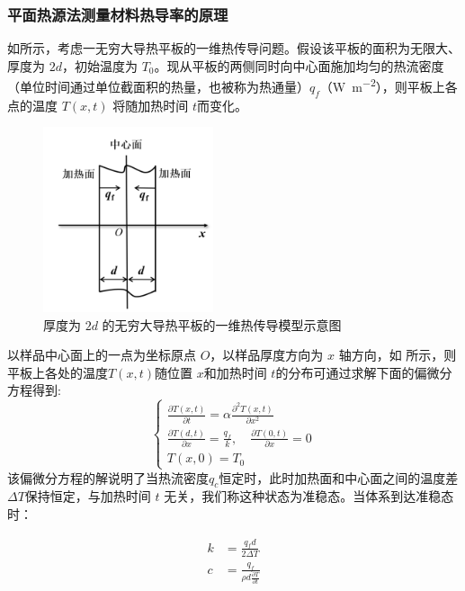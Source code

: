         \subsubsection{平面热源法测量材料热导率的原理}
            如所示，考虑一无穷大导热平板的一维热传导问题。假设该平板的面积为无限大、厚度为 $2d$，初始温度为 $T_0$。现从平板的两侧同时向中心面施加均匀的热流密度（单位时间通过单位截面积的热量，也被称为热通量）$q_f$（\unit{\watt\per\meter\squared}），则平板上各点的温度 $T(x,t)$ 将随加热时间 $t$而变化。
            \begin{figure}[!ht]\centering
                \includegraphics[width=50mm]{img/A10/fg2.png}
                \caption{厚度为 $2d$ 的无穷大导热平板的一维热传导模型示意图 \label{fig:A10.2}}
            \end{figure}\par
            以样品中心面上的一点为坐标原点 $O$，以样品厚度方向为 $x$ 轴方向，如 所示，则平板上各处的温度$T(x,t)$随位置 $x$和加热时间 $t$的分布可通过求解下面的偏微分方程得到:
            \begin{equation}
                \begin{cases}
                    \frac{\partial T(x,t)}{\partial t}=\alpha\frac{\partial^2T(x,t)}{\partial x^2}\\
                    \frac{\partial T(d,t)}{\partial x}=\frac{q_f}k ,\quad\frac{\partial T(0,t)}{\partial x}=0\\
                    T(x,0)=T_0
                \end{cases}
            \end{equation}
            该偏微分方程的解说明了当热流密度$q_c$恒定时，此时加热面和中心面之间的温度差$\varDelta T$保持恒定，与加热时间 $t$ 无关，我们称这种状态为准稳态。当体系到达准稳态时：\par
            \begin{equation}
                \begin{aligned}
                    k&=\frac{q_fd}{2\Delta T}\\
                    c&=\frac{q_f}{\rho d\frac{\partial T}{\partial t}}
                \end{aligned}
            \end{equation}

